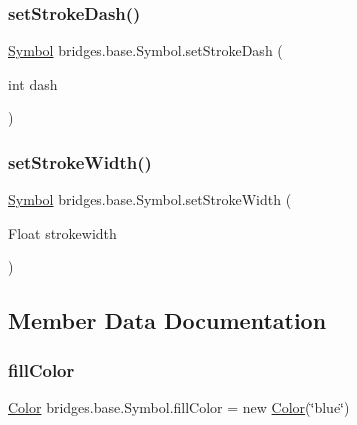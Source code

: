 \mbox{\label{classbridges_1_1base_1_1_symbol_ad36224ec7cb588dbbaa8040ef59ffbfc}} 
\subsubsection{\texorpdfstring{setStrokeDash()}{setStrokeDash()}}
{\footnotesize\ttfamily \mbox{\hyperlink{classbridges_1_1base_1_1_symbol}{Symbol}} bridges.\+base.\+Symbol.\+set\+Stroke\+Dash (\begin{DoxyParamCaption}\item[{int}]{dash }\end{DoxyParamCaption})}

\mbox{\label{classbridges_1_1base_1_1_symbol_a0d432410bcbee83060f064d69365bbea}} 
\subsubsection{\texorpdfstring{setStrokeWidth()}{setStrokeWidth()}}
{\footnotesize\ttfamily \mbox{\hyperlink{classbridges_1_1base_1_1_symbol}{Symbol}} bridges.\+base.\+Symbol.\+set\+Stroke\+Width (\begin{DoxyParamCaption}\item[{Float}]{strokewidth }\end{DoxyParamCaption})}



\subsection{Member Data Documentation}
\mbox{\label{classbridges_1_1base_1_1_symbol_a44f00712b6c584c7778ed9de4c394cbf}} 
\subsubsection{\texorpdfstring{fillColor}{fillColor}}
{\footnotesize\ttfamily \mbox{\hyperlink{classbridges_1_1base_1_1_color}{Color}} bridges.\+base.\+Symbol.\+fill\+Color = new \mbox{\hyperlink{classbridges_1_1base_1_1_color}{Color}}(\char`\"{}blue\char`\"{})\hspace{0.3cm}{\ttfamily [protected]}}

